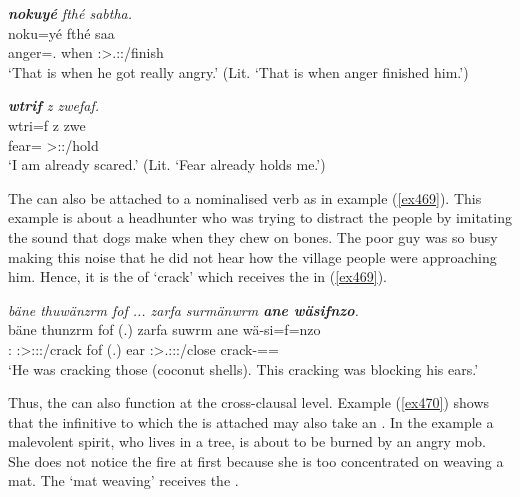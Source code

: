 \begin{exe}
	\ex \emph{\textbf{nokuyé} fthé sabtha.}\\
	\gll noku=yé fthé saa\\
	anger=\Erg.\Nsg{} when \Stsg:\Sbj>\Tsg.\Masc:\Pst:\Pfv/finish\\
	\trans `That is when he got really angry.' (Lit. `That is when anger finished him.')\\
	\label{ex468}
\end{exe}
\begin{exe}
	\ex \emph{\textbf{wtrif} z zwefaf.}\\
	\gll wtri=f z zwe\\
	fear=\Erg{} \Iam{} \Stsg>\Fsg:\Rpst:\Pfv/hold\\
	\trans `I am already scared.' (Lit. `Fear already holds me.')
	\label{ex467}
\end{exe}

The   can also be attached to a nominalised verb as in example (\ref{ex469}). This example is about a  headhunter who was trying to distract the people by imitating the sound that dogs make when they chew on bones. The poor guy was so busy making this noise that he did not hear how the village people were approaching him. Hence, it is the  of `crack' which receives the   in (\ref{ex469}).

\begin{exe}
	\ex \emph{bäne thuwänzrm fof ... zarfa surmänwrm \textbf{ane wäsifnzo}.}\\
	\gll bäne thunzrm fof (.) zarfa suwrm ane wä-si=f=nzo\\
	\Dem:\Med{} \Stsg:\Sbj>\Stpl:\Obj:\Pst:\Dur/crack fof (.) ear \Stsg:\Sbj>\Tsg.\Masc:\Obj:\Pst:\Dur/close \Dem{} crack-\Nmlz=\Erg=\Only\\
	\trans `He was cracking those (coconut shells). This cracking was blocking his ears.'
	\label{ex469}
\end{exe}

Thus, the   can also function at the cross-clausal level. Example (\ref{ex470}) shows that the infinitive to which the  is attached may also take an . In the example a malevolent spirit, who lives in a tree, is about to be burned by an angry mob. She does not notice the fire at first because she is too concentrated on weaving a mat. The `mat weaving' receives the .

